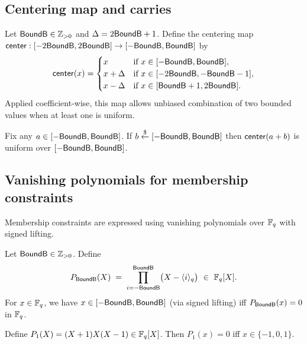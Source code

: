 \subsection{Centering map and carries}
Let \(\mathsf{BoundB}\in\mathbb{Z}_{>0}\) and \(\Delta=2\mathsf{BoundB}+1\). Define the centering map
\(\mathsf{center}:[-2\mathsf{BoundB},2\mathsf{BoundB}]\to[-\mathsf{BoundB},\mathsf{BoundB}]\) by
\[
\mathsf{center}(x)=
\begin{cases}
x & \text{if } x\in[-\mathsf{BoundB},\mathsf{BoundB}],\\
x+\Delta & \text{if } x\in[-2\mathsf{BoundB},-\mathsf{BoundB}-1],\\
x-\Delta & \text{if } x\in[\mathsf{BoundB}+1,2\mathsf{BoundB}].
\end{cases}
\]
Applied coefficient-wise, this map allows unbiased combination of two bounded values when at least one is uniform.

\begin{lemma}\label{lem:center-uniform}
Fix any \(a\in[-\mathsf{BoundB},\mathsf{BoundB}]\). If \(b\overset{\$}{\leftarrow} [-\mathsf{BoundB},\mathsf{BoundB}]\) then \(\mathsf{center}(a+b)\) is uniform over
\([-\mathsf{BoundB},\mathsf{BoundB}]\).
\end{lemma}

\subsection{Vanishing polynomials for membership constraints}
Membership constraints are expressed using vanishing polynomials over \(\mathbb{F}_q\) with signed lifting.

\begin{definition}\label{def:vanish-bound}
Let \(\mathsf{BoundB}\in\mathbb{Z}_{>0}\). Define
\[
  P_{\BoundB}(X) \;=\; \prod_{i=-\BoundB}^{\BoundB}\bigl(X-\langle i\rangle_q\bigr)\ \in\ \Fq[X].
\]
For \(x\in\mathbb{F}_q\), we have \(x\in[-\mathsf{BoundB},\mathsf{BoundB}]\) (via signed lifting) iff \(P_{\mathsf{BoundB}}(x)=0\) in \(\mathbb{F}_q\).
\end{definition}

\begin{definition}\label{def:vanish-carry}
Define \(P_{1}(X)=(X+1)X(X-1)\in\mathbb{F}_q[X]\). Then \(P_1(x)=0\) iff \(x\in\{-1,0,1\}\).
\end{definition}
